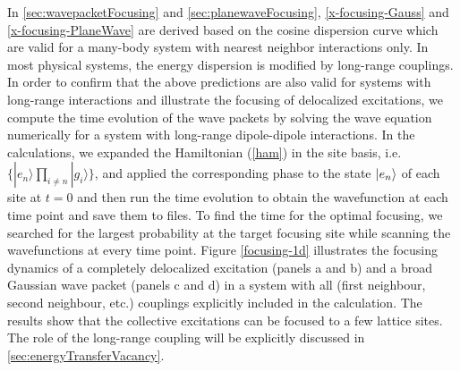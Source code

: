 In \autoref{sec:wavepacketFocusing} and \autoref{sec:planewaveFocusing}, \autoref{x-focusing-Gauss} and \autoref{x-focusing-PlaneWave} are derived based on the cosine dispersion curve which are
valid for a many-body system with nearest neighbor interactions
only. In most physical systems, the energy dispersion is modified
by long-range couplings. In order to confirm that the above
predictions are also valid for systems with long-range
 interactions and illustrate the focusing of
delocalized excitations, we compute the time evolution of the wave
packets by solving the wave equation numerically for a system with
long-range dipole-dipole interactions. In the calculations, we expanded the Hamiltonian (\ref{ham}) in the site 
basis, i.e. $\{ |e_n\rangle \prod_{i\neq n} |g_i\rangle\}$,  and applied the corresponding phase to the state
$| e_n \rangle$ of each site at $t=0$ and then run the time evolution to obtain the wavefunction at each time point and 
save them to files. To find the time for the optimal focusing, we searched for the largest probability at the target focusing site while scanning the wavefunctions at every time point.  
Figure \ref{focusing-1d}
illustrates the focusing dynamics of a completely delocalized
excitation (panels a and b) and a broad Gaussian wave packet (panels c and d) in a
system with all (first neighbour, second neighbour, etc.) couplings explicitly included  in the
calculation. The results show that  
the collective excitations can be focused to a few lattice sites. The role of the long-range coupling will be
explicitly discussed in \autoref{sec:energyTransferVacancy}. 

